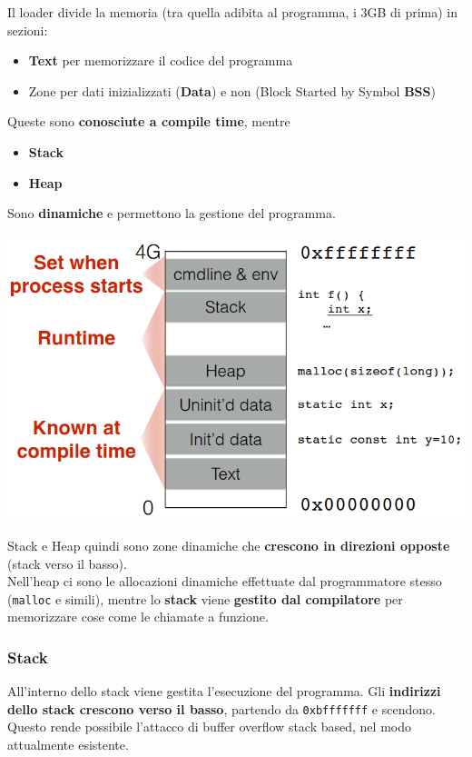 Il loader divide la memoria (tra quella adibita al programma, i 3GB di prima) in sezioni:
\begin{itemize}
	\item \textbf{Text} per memorizzare il codice del programma
	\item Zone per dati inizializzati (\textbf{Data}) e non (Block Started by Symbol \textbf{BSS})
\end{itemize}
Queste sono \textbf{conosciute a compile time}, mentre
\begin{itemize}
	\item \textbf{Stack}
	\item \textbf{Heap}
\end{itemize}
Sono \textbf{dinamiche} e permettono la gestione del programma.
\begin{center}
	\includegraphics[width=0.85\linewidth]{img/boverflow/memory_all1}
\end{center}

Stack e Heap quindi sono zone dinamiche che \textbf{crescono in direzioni opposte} (stack verso il basso).\\
Nell'heap ci sono le allocazioni dinamiche effettuate dal programmatore stesso (\texttt{malloc} e simili), mentre lo \textbf{stack} viene \textbf{gestito dal compilatore} per memorizzare cose come le chiamate a funzione. \\

\newpage

\subsubsection{Stack}
All'interno dello stack viene gestita l'esecuzione del programma. Gli \textbf{indirizzi dello stack crescono verso il basso}, partendo da \texttt{0xbfffffff} e scendono. Questo rende possibile l'attacco di buffer overflow stack based, nel modo attualmente esistente.\\

